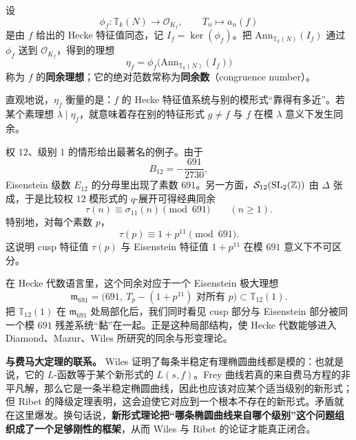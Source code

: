 \begin{definition}[同余数]
\label{def:congruence-number}
设
\[
  \phi_f\colon \mathbb{T}_k(N)\longrightarrow \mathcal{O}_{K_f},
  \qquad T_n\longmapsto a_n(f)
\]
是由 $f$ 给出的 Hecke 特征值同态，记 $I_f=\ker(\phi_f)$。把 $\mathrm{Ann}_{\mathbb{T}_k(N)}(I_f)$ 通过 $\phi_f$ 送到 $\mathcal{O}_{K_f}$，得到的理想
\[
  \eta_f=\phi_f\bigl(\mathrm{Ann}_{\mathbb{T}_k(N)}(I_f)\bigr)
\]称为 $f$ 的\textbf{同余理想}；它的绝对范数常称为\textbf{同余数}（congruence number）。
\end{definition}

直观地说，$\eta_f$ 衡量的是：$f$ 的 Hecke 特征值系统与别的模形式“靠得有多近”。若某个素理想 $\lambda\mid \eta_f$，就意味着存在别的特征形式 $g\neq f$ 与 $f$ 在模 $\lambda$ 意义下发生同余。

\begin{example}[Ramanujan 的模 $691$ 同余]
\label{ex:ramanujan-691}
权 $12$、级别 $1$ 的情形给出最著名的例子。由于
\[
  B_{12}=-\frac{691}{2730},
\]
Eisenstein 级数 $E_{12}$ 的分母里出现了素数 $691$。另一方面，$\mathcal{S}_{12}(\mathrm{SL}_2(\mathbb{Z}))$ 由 $\Delta$ 张成，于是比较权 $12$ 模形式的 $q$-展开可得经典同余
\[
  \tau(n)\equiv \sigma_{11}(n) \pmod{691}
  \qquad (n\ge 1).
\]
特别地，对每个素数 $p$，
\[
  \tau(p)\equiv 1+p^{11} \pmod{691}.
\]
这说明 cusp 特征值 $\tau(p)$ 与 Eisenstein 特征值 $1+p^{11}$ 在模 $691$ 意义下不可区分。
\end{example}

在 Hecke 代数语言里，这个同余对应于一个 Eisenstein 极大理想
\[
  \mathfrak{m}_{691}=\bigl(691,\ T_p-(1+p^{11})\text{ 对所有 }p\bigr)
  \subset \mathbb{T}_{12}(1).
\]
把 $\mathbb{T}_{12}(1)$ 在 $\mathfrak{m}_{691}$ 处局部化后，我们同时看见 cusp 部分与 Eisenstein 部分被同一个模 $691$ 残差系统“黏”在一起。正是这种局部结构，使 Hecke 代数能够进入 Diamond、Mazur、Wiles 所研究的同余与形变理论。

\textbf{与费马大定理的联系。}
Wiles 证明了每条半稳定有理椭圆曲线都是模的：也就是说，它的 $L$-函数等于某个新形式的 $L(s,f)$。Frey 曲线若真的来自费马方程的非平凡解，那么它是一条半稳定椭圆曲线，因此也应该对应某个适当级别的新形式；但 Ribet 的降级定理表明，这会迫使它对应到一个根本不存在的新形式。矛盾就在这里爆发。换句话说，\textbf{新形式理论把“哪条椭圆曲线来自哪个级别”这个问题组织成了一个足够刚性的框架}，从而 Wiles 与 Ribet 的论证才能真正闭合。



